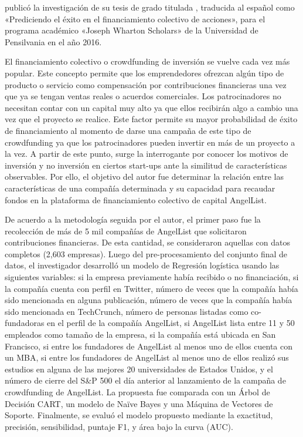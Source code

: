 \newpage
\cite{pr_beckwith2016predcrowd} publicó la investigación de su tesis de grado titulada , traducida al español como «Prediciendo el éxito en el financiamiento colectivo de acciones», para el programa académico «Joseph Wharton Scholars» de la Universidad de Pensilvania en el año 2016.

El financiamiento colectivo o crowdfunding de inversión se vuelve cada vez más popular. Este concepto permite que los emprendedores ofrezcan algún tipo de producto o servicio como compensación por contribuciones financieras una vez que ya se tengan ventas reales o acuerdos comerciales. Los patrocinadores no necesitan contar con un capital muy alto ya que ellos recibirán algo a cambio una vez que el proyecto se realice. Este factor permite su mayor probabilidad de éxito de financiamiento al momento de darse una campaña de este tipo de crowdfunding ya que los patrocinadores pueden invertir en más de un proyecto a la vez. A partir de este punto, surge la interrogante por conocer los motivos de inversión y no inversión en ciertos start-ups ante la similitud de características observables. Por ello, el objetivo del autor fue determinar la relación entre las características de una compañía determinada y su capacidad para recaudar fondos en la plataforma de financiamiento colectivo de capital AngelList.

De acuerdo a la metodología seguida por el autor, el primer paso fue la recolección de más de 5 mil compañías de AngelList que solicitaron contribuciones financieras. De esta cantidad, se consideraron aquellas con datos completos (2,603 empresas). Luego del pre-procesamiento del conjunto final de datos, el investigador desarrolló un modelo de Regresión logística usando las siguientes variables: si la empresa previamente había recibido o no financiación, si la compañía cuenta con perfil en Twitter, número de veces que la compañía había sido mencionada en alguna publicación, número de veces que la compañía había sido mencionada en TechCrunch, número de personas listadas como co-fundadoras en el perfil de la compañía AngelList, si AngelList lista entre 11 y 50 empleados como tamaño de la empresa, si la compañía está ubicada en San Francisco, si entre los fundadores de AngelList al menos uno de ellos cuenta con un MBA, si entre los fundadores de AngelList al menos uno de ellos realizó sus estudios en alguna de las mejores 20 universidades de Estados Unidos, y el número de cierre del S\&P 500 el día anterior al lanzamiento de la campaña de crowdfunding de AngelList. La propuesta fue comparada con un Árbol de Decisión CART, un modelo de Naïve Bayes y una Máquina de Vectores de Soporte. Finalmente, se evaluó el modelo propuesto mediante la exactitud, precisión, sensibilidad, puntaje F1, y área bajo la curva (AUC).

